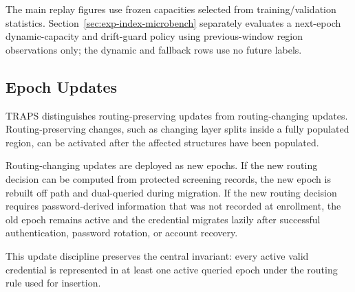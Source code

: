 The main replay figures use frozen capacities selected from training/validation statistics. Section~\ref{sec:exp-index-microbench} separately evaluates a next-epoch dynamic-capacity and drift-guard policy using previous-window region observations only; the dynamic and fallback rows use no future labels.

\subsection{Epoch Updates}

TRAPS distinguishes routing-preserving updates from routing-changing updates. Routing-preserving changes, such as changing layer splits inside a fully populated region, can be activated after the affected structures have been populated.

Routing-changing updates are deployed as new epochs. If the new routing decision can be computed from protected screening records, the new epoch is rebuilt off path and dual-queried during migration. If the new routing decision requires password-derived information that was not recorded at enrollment, the old epoch remains active and the credential migrates lazily after successful authentication, password rotation, or account recovery.

This update discipline preserves the central invariant: every active valid credential is represented in at least one active queried epoch under the routing rule used for insertion.
